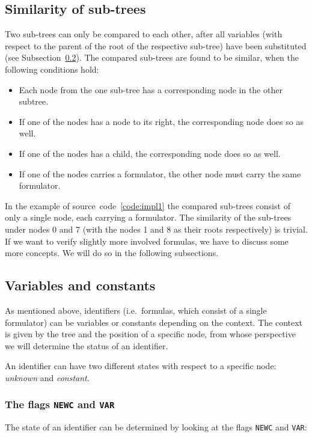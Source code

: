 \documentclass[british]{article}
\begin{document}
\pagebreak{}

\subsection{Similarity of sub-trees}\label{sec:similar}
\textcolor{dartmouthgreen}{Two sub-trees can only be compared to each other,
after all variables (with respect to the parent of the root of the
respective sub-tree) have been substituted (see Subsection~\ref{sec:var}).} The
compared sub-trees are found to be similar, when the following conditions hold:

\begin{itemize}
	\item 
		Each node from the one sub-tree has a corresponding node in the other
		subtree.
	\item
		If one of the nodes has a node to its right, the corresponding node does
		so as well.
	\item
		If one of the nodes has a child, the corresponding node does so as well.
	\item
		If one of the nodes carries a formulator, the other node must carry the same
		formulator.
\end{itemize}

In the example of source~code~\ref{code:impl1} the compared sub-trees consist of
only a single node, each carrying a formulator. The similarity of the sub-trees
under nodes 0 and 7 (with the nodes 1 and 8 as their roots respectively) is
trivial. If we want to verify slightly more involved formulas, we have to
discuss some more concepts. We will do so in the following subsections.

\subsection{Variables and constants}\label{sec:var}

As mentioned above, identifiers (i.e.\ formulas, which consist of a single
formulator) can be variables or constants depending on the context. The context
is given by the tree and the position of a specific node, from whose
perspective we will determine the status of an identifier.

\medskip{}
\textcolor{dartmouthgreen}{An identifier can have two different states with
respect to a specific node: \emph{unknown} and \emph{constant}.}

\subsubsection{The flags \texttt{NEWC} and \texttt{VAR}}
\textcolor{dartmouthgreen}{The state of an identifier can be determined by
looking at the flags \texttt{NEWC} and \texttt{VAR}:}
\end{document}
